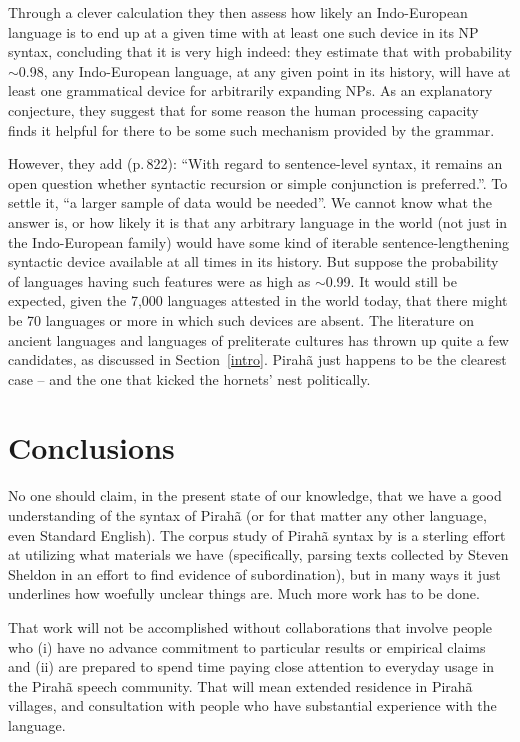\documentclass[output=paper,colorlinks,citecolor=brown
]{langscibook}
\begin{document}
Through a clever calculation they then assess how likely an Indo-European
language is to end up at a given time with at least one such device in
its NP syntax, concluding that it is very high indeed: they estimate
that with probability $\sim$0.98, any Indo-European language, at any
given point in its history, will have at least one grammatical device
for arbitrarily expanding NPs. As an explanatory conjecture, they suggest
that for some reason the human processing capacity finds it helpful for
there to be some such mechanism provided by the grammar.

However, they add (p.\,822): ``With regard to sentence-level syntax,
it remains an open question whether syntactic recursion or simple
conjunction is preferred.''. To settle it, ``a larger sample of data
would be needed''. We cannot know what the answer is, or how likely
it is that any arbitrary language in the world (not just in the
Indo-European family) would have some kind of iterable
sentence-lengthening syntactic device available at all times in its
history. But suppose the probability of languages having such features
were as high as $\sim$0.99. It would still be expected, given the
7,000 languages attested in the world today, that there might be 70
languages or more in which such devices are absent. The literature
on ancient languages and languages of preliterate cultures has thrown
up quite a few candidates, as discussed in Section~\ref{intro}.
Pirah{\~a} just happens to be the clearest case -- and the one that
kicked the hornets' nest politically.

\section{Conclusions}

No one should claim, in the present state of our knowledge, that we
have a good understanding of the syntax of Pirah{\~a} (or for that
matter any other language, even Standard English). The corpus study
of Pirah{\~a} syntax by \citet{FutrellEtAl16} is a sterling effort
at utilizing what materials we have (specifically, parsing texts
collected by Steven Sheldon in an effort to find evidence of
subordination), but in many ways it just underlines how woefully
unclear things are. Much more work has to be done.

That work will not be accomplished without collaborations that involve
people who (i) have no advance commitment to particular results or
empirical claims and (ii) are prepared to spend time paying close
attention to everyday usage in the Pirah{\~a} speech community. That
will mean extended residence in Pirah{\~a} villages, and consultation
with people who have substantial experience with the language.
\end{document}
